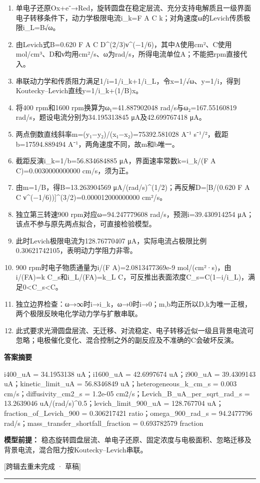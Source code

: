 \documentclass[UTF8,11pt,a4paper]{ctexart}
\begin{document}
\begin{enumerate}
\item 单电子还原Ox+e⁻→Red，旋转圆盘在稳定层流、充分支持电解质且一级界面电子转移条件下，动力学极限电流i\_k=F A C k；对角速度ω的Levich传质极限i\_L=B√ω。
\item 由Levich式B=0.620 F A C D\textasciicircum{}(2/3)ν\textasciicircum{}(−1/6)，其中A使用cm²、C使用mol/cm³、D和ν均用cm²/s、ω为rad/s，所得电流单位A；不能把rpm直接代入。
\item 串联动力学和传质阻力满足1/i=1/i\_k+1/i\_L，令x=1/√ω、y=1/i，得到Koutecky–Levich直线y=1/i\_k+(1/B)x。
\item 将400 rpm和1600 rpm换算为ω₁=41.887902048 rad/s与ω₂=167.55160819 rad/s，题设电流分别为34.195313845 μA及42.699767418 μA。
\item 两点倒数直线斜率m=(y₁−y₂)/(x₁−x₂)=75392.581028 A⁻¹ s⁻¹/²，截距b=17594.889494 A⁻¹，两角速度不同，故m和b唯一。
\item 截距反演i\_k=1/b=56.834684885 μA，界面速率常数k=i\_k/(F A C)=0.0030000000000 cm/s，须为正。
\item 由m=1/B，得B=13.263904569 μA/(rad/s)\textasciicircum{}(1/2)；再反解D=[B/(0.620 F A C ν\textasciicircum{}(−1/6))]\textasciicircum{}(3/2)=0.000012000000000 cm²/s。
\item 独立第三转速900 rpm对应ω=94.247779608 rad/s，预测i=39.430914254 μA；该点不参与原先两点拟合，可直接检验模型。
\item 此时Levich极限电流为128.76770407 μA，实际电流占极限比例0.30621742105，表明动力学阻力非零。
\item 900 rpm时电子物质通量为i/(F A)=2.0813477369e-9 mol/(cm²·s)，由i/(FA)=k C\_s和i\_L/(FA)=k\_L C，可反推出表面浓度C\_s=C(1−i/i\_L)，满足0<C\_s<C。
\item 独立边界检查：ω→∞时i→i\_k，ω→0时i→0；m,b均正所以D,k为唯一正根，两个极限反映电化学动力学与扩散串联。
\item 此式要求光滑圆盘层流、无迁移、对流稳定、电子转移近似一级且背景电流可忽略；电极催化变化、混合控制之外的副反应及不准确的C会破坏反演。
\end{enumerate}
\noindent\textbf{答案摘要}\par
i400\_uA = 34.1953138 uA；i1600\_uA = 42.6997674 uA；i900\_uA = 39.4309143 uA；kinetic\_limit\_uA = 56.8346849 uA；heterogeneous\_k\_cm\_s = 0.003 cm/s；diffusivity\_cm2\_s = 1.2e-05 cm2/s；Levich\_B\_uA\_per\_sqrt\_rad\_s = 13.2639046 uA/(rad/s)\textasciicircum{}0.5；levich\_limit\_900\_uA = 128.767704 uA；fraction\_of\_Levich\_900 = 0.306217421 ratio；omega\_900\_rad\_s = 94.2477796 rad/s；mass\_transfer\_shortfall\_fraction = 0.693782579 fraction\par
\noindent\textbf{模型前提：}
稳态旋转圆盘层流、单电子还原、固定浓度与电极面积、忽略迁移及背景电流，混合阻力按Koutecky–Levich串联。\par
\noindent\textcolor{red!65!black}{[跨辑去重未完成 · 草稿]} \par
\medskip\hrule\medskip
{}
\end{document}
